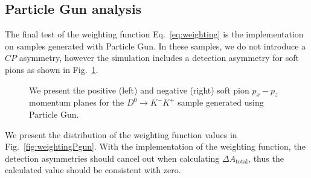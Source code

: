 \documentclass{article}
\begin{document}
        \subsection{Particle Gun analysis}
        The final test of the weighting function Eq.~\ref{eq:weighting} is the implementation on samples generated with Particle Gun.
        In these samples, we do not introduce a $CP$ asymmetry, however the simulation includes a detection asymmetry for soft pions as shown in Fig.~\ref{fig:detection_pgun}.
        \begin{figure}[h!]
                \centering
                \caption{We present the positive (left) and negative (right) soft pion $p_x - p_z$ momentum planes for the $D^0\to K^-K^+$ sample generated using Particle Gun.}
                \label{fig:detection_pgun}
        \end{figure}

        We present the distribution of the weighting function values in Fig.~\ref{fig:weightingPgun}.
        With the implementation of the weighting function, the detection asymmetries should cancel out when calculating $\Delta A_\text{total}$, thus the calculated value should be consistent with zero.
\end{document}
